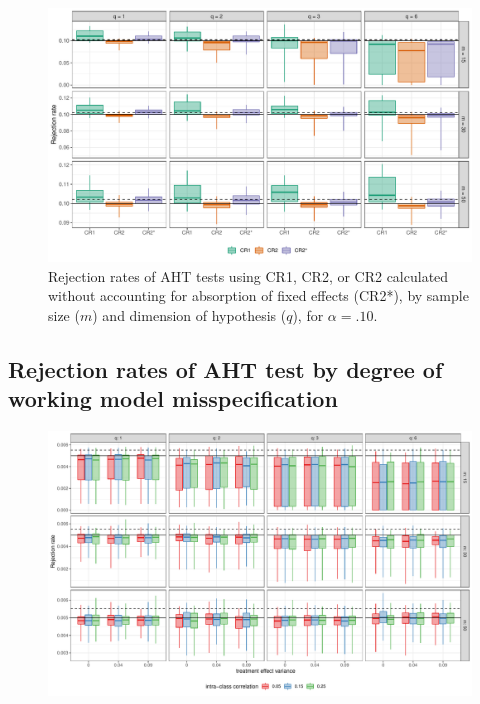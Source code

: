 \documentclass[12pt]{article}
\begin{document}
\begin{landscape}
\begin{figure}[H]

{\centering \includegraphics[width=\linewidth]{CR_fig/absorption_10-1} 

}

\caption{Rejection rates of AHT tests using CR1, CR2, or CR2 calculated without accounting for absorption of fixed effects (CR2*), by sample size ($m$) and dimension of hypothesis ($q$), for $\alpha = .10$.}\label{fig:absorption_10}
\end{figure}

\subsection{Rejection rates of AHT test by degree of working model misspecification}

\begin{figure}[H]

{\centering \includegraphics[width=\linewidth]{CR_fig/misspecification_005-1} 

}
\end{figure}
\end{landscape}
\end{document}
